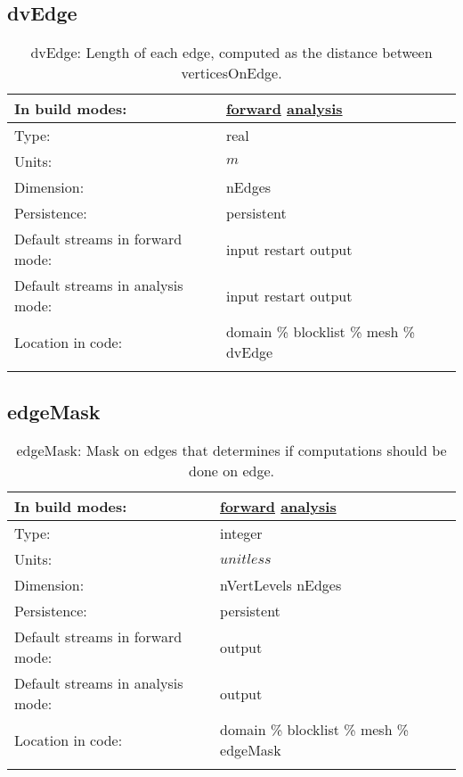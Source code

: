 \subsection[dvEdge]{dvEdge}
\label{subsec:var_sec_mesh_dvEdge}
\begin{center}
\begin{longtable}{| p{2.0in} | p{4.0in} |}
        \hline 
        In build modes: & \hyperref[subsec:forward_var_tab_mesh]{forward} \hyperref[subsec:analysis_var_tab_mesh]{analysis} \\
        \hline 
        Type: & real \\
        \hline 
        Units: & $m$ \\
        \hline 
        Dimension: & nEdges \\
        \hline 
        Persistence: & persistent \\
        \hline 
		 Default streams in forward mode: &  input restart output \\
        \hline 
		 Default streams in analysis mode: &  input restart output \\
        \hline 
		 Location in code: & domain \% blocklist \% mesh \% dvEdge \\
		 \hline 
    \caption{dvEdge: Length of each edge, computed as the distance between verticesOnEdge.}
\end{longtable}
\end{center}
\subsection[edgeMask]{edgeMask}
\label{subsec:var_sec_mesh_edgeMask}
\begin{center}
\begin{longtable}{| p{2.0in} | p{4.0in} |}
        \hline 
        In build modes: & \hyperref[subsec:forward_var_tab_mesh]{forward} \hyperref[subsec:analysis_var_tab_mesh]{analysis} \\
        \hline 
        Type: & integer \\
        \hline 
        Units: & $unitless$ \\
        \hline 
        Dimension: & nVertLevels nEdges \\
        \hline 
        Persistence: & persistent \\
        \hline 
		 Default streams in forward mode: &  output \\
        \hline 
		 Default streams in analysis mode: &  output \\
        \hline 
		 Location in code: & domain \% blocklist \% mesh \% edgeMask \\
		 \hline 
    \caption{edgeMask: Mask on edges that determines if computations should be done on edge.}
\end{longtable}
\end{center}
